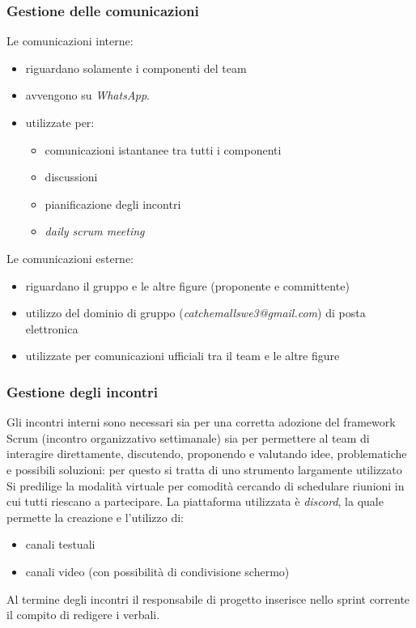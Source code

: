     \subsubsection{Gestione delle comunicazioni}
        Le comunicazioni interne:
        \begin{itemize}
            \item riguardano solamente i componenti del team 
            \item avvengono su \textit{WhatsApp}.
            \item utilizzate per:
                \begin{itemize}
                    \item comunicazioni istantanee tra tutti i componenti
                    \item discussioni
                    \item pianificazione degli incontri
                    \item \textit{daily scrum meeting} 
                \end{itemize}
        \end{itemize}
            
        Le comunicazioni esterne:
        \begin{itemize}
            \item riguardano il gruppo e le altre figure (proponente e committente)
            \item utilizzo del dominio di gruppo (\textit{catchemallswe3@gmail.com}) di posta elettronica
            \item utilizzate per comunicazioni ufficiali tra il team e le altre figure
        \end{itemize}

        
        
    \subsubsection{Gestione degli incontri}
        Gli incontri interni sono necessari sia per una corretta adozione del framework Scrum (incontro organizzativo settimanale)
        sia per permettere al team di interagire direttamente, discutendo, proponendo e valutando idee, problematiche e possibili 
        soluzioni: per questo si tratta di uno strumento largamente utilizzato
        \newline
        Si predilige la modalità virtuale per comodità cercando di schedulare riunioni in cui tutti riescano a partecipare.
        \newline
        La piattaforma utilizzata è \textit{discord}, la quale permette la creazione e l'utilizzo di:
        \begin{itemize}
            \item canali testuali
            \item canali video (con possibilità di condivisione schermo)
        \end{itemize}
        Al termine degli incontri il responsabile di progetto inserisce nello sprint corrente il compito di redigere i verbali. 

